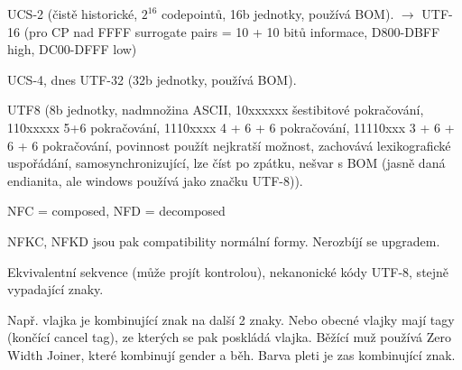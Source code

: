 \documentclass[12pt]{article}					%
\begin{document}
    \begin{definice}[Reprezentace]
        UCS-2 (čistě historické, $2^{16}$ codepointů, 16b jednotky, používá BOM). $\longrightarrow$ UTF-16 (pro CP nad FFFF surrogate pairs = 10 + 10 bitů informace, D800-DBFF high, DC00-DFFF low)

        UCS-4, dnes UTF-32 (32b jednotky, používá BOM).

        UTF8 (8b jednotky, nadmnožina ASCII, 10xxxxxx šestibitové pokračování, 110xxxxx 5+6 pokračování, 1110xxxx 4 + 6 + 6 pokračování, 11110xxx 3 + 6 + 6 + 6 pokračování, povinnost použít nejkratší možnost, zachovává lexikografické uspořádání, samosynchronizující, lze číst po zpátku, nešvar s BOM (jasně daná endianita, ale windows používá jako značku UTF-8)).
    \end{definice}

    \begin{definice}
        NFC = composed, NFD = decomposed

        NFKC, NFKD jsou pak compatibility normální formy. Nerozbíjí se upgradem.
    \end{definice}

    \begin{upozorneni}
        Ekvivalentní sekvence (může projít kontrolou), nekanonické kódy UTF-8, stejně vypadající znaky.
    \end{upozorneni}

    \begin{definice}
        Např. vlajka je kombinující znak na další 2 znaky. Nebo obecné vlajky mají tagy (končící cancel tag), ze kterých se pak poskládá vlajka. Běžící muž používá Zero Width Joiner, které kombinují gender a běh. Barva pleti je zas kombinující znak.
    \end{definice}
\end{document}
